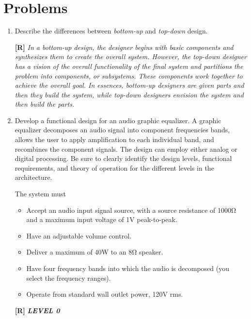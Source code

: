 \section{Problems}
\label{section:funcDecomProblems}
\graphicspath{ {./chapter05/FigSolutions} }

\begin{enumerate}
\def\labelenumi{\arabic{enumi}.}
\item
  Describe the differences between \emph{bottom-up} and \emph{top-down}
  design.

  \begin{onlysolution}
    \textbf{[R]}
    \itshape
    In a bottom-up design, the designer begins with basic components and 
    synthesizes them to create the overall system. However, the top-down 
    designer has a vision of the overall functionality of the final system 
    and partitions the problem into components, or subsystems. These components 
    work together to achieve the overall goal. In essences, bottom-up designers 
    are given parts and then they build the system, while top-down designers 
    envision the system and then build the parts.
  \end{onlysolution}
\item
  Develop a functional design for an audio graphic equalizer. A graphic
  equalizer decomposes an audio signal into component frequencies bands,
  allows the user to apply amplification to each individual band, and
  recombines the component signals. The design can employ either analog
  or digital processing. Be sure to clearly identify the design levels,
  functional requirements, and theory of operation for the different
  levels in the architecture.

The system must
\begin{itemize}
\item
  Accept an audio input signal source, with a source resistance of 1000Ω
  and a maximum input voltage of 1V peak-to-peak.
\item
  Have an adjustable volume control.
\item
  Deliver a maximum of 40W to an 8Ω speaker.
\item
  Have four frequency bands into which the audio is decomposed (you
  select the frequency ranges).
\item
  Operate from standard wall outlet power, 120V rms.
  \end{itemize}

  \begin{onlysolution}
    \textbf{[R]}
    \itshape
    \textbf{LEVEL 0}


\end{onlysolution}
\end{enumerate}
